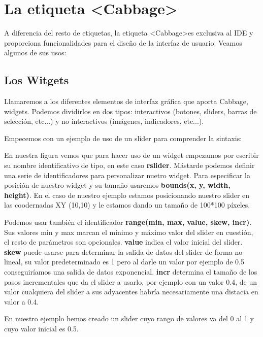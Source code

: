 \section{La etiqueta \textless Cabbage\textgreater}\label{sec:CabbageInst}

A diferencia del resto de etiquetas, la etiqueta \textless Cabbage\textgreater es exclusiva al IDE y proporciona funcionalidades para el diseño de la interfaz de usuario. Veamos algunos de sus usos:

\subsection{Los Witgets}

Llamaremos a los diferentes elementos de interfaz gráfica que aporta Cabbage, widgets. Podemos dividirlos en dos tipos: interactivos (botones, sliders, barras de selección, etc...) y no interactivos (imágenes, indicadores, etc...).

Empecemos con un ejemplo de uso de un slider para comprender la sintaxis:


En nuestra figura vemos que para hacer uso de un widget empezamos por escribir su nombre identificativo de tipo, en este caso \textbf{rslider}. Mástarde podemos definir una serie de identificadores para personalizar nuetro widget. Para especificar la posición de nuestro widget y su tamaño usaremos \textbf{bounds(x, y, width, height)}. En el caso de nuestro ejemplo estamos posicionando nuestro slider en las coodernadas XY (10,10) y le estamos dando un tamaño de 100*100 píxeles.

Podemos usar también el identificador \textbf{range(min, max, value, skew, incr)}. Sus valores min y max marcan el mínimo y máximo valor del slider en cuestión, el resto de parámetros son opcionales. \textbf{value} indica el valor inicial del slider. \textbf{skew} puede usarse para determinar la salida de datos del slider de forma no lineal, su valor predeterminado es 1 pero al darle un valor por ejemplo de 0.5 conseguiríamos una salida de datos exponencial. \textbf{incr} determina el tamaño de los pasos incrementales que da el slider a usarlo, por ejemplo con un valor 0.4, de un valor cualquiera del slider a sus adyacentes habría necesariamente una distacia en valor a 0.4.

En nuestro ejemplo hemos creado un slider cuyo rango de valores va del 0 al 1 y cuyo valor inicial es 0.5.

